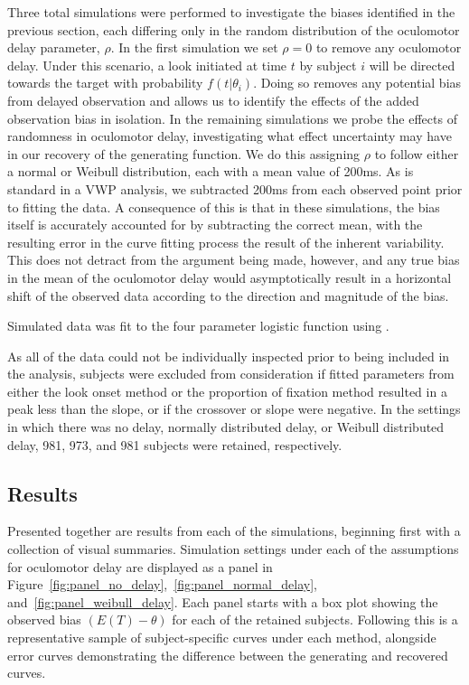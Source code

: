 Three total simulations were performed to investigate the biases identified in the previous section, each differing only in the random distribution of the oculomotor delay parameter, $\rho$. In the first simulation we set $\rho = 0$ to remove any oculomotor delay. Under this scenario, a look initiated at time $t$ by subject $i$ will be directed towards the target with probability $f(t|\theta_i)$. Doing so removes any potential bias from delayed observation and allows us to identify the effects of the added observation bias in isolation. In the remaining simulations we probe the effects of randomness in oculomotor delay, investigating what effect uncertainty may have in our recovery of the generating function. We do this assigning $\rho$ to follow either a normal or Weibull distribution, each with a mean value of 200ms. As is standard in a VWP analysis, we subtracted 200ms from each observed point prior to fitting the data. A consequence of this is that in these simulations, the bias itself is accurately accounted for by subtracting the correct mean, with the resulting error in the curve fitting process the result of the inherent variability. This does not detract from the argument being made, however, and any true bias in the mean of the oculomotor delay would asymptotically result in a horizontal shift of the observed data according to the direction and magnitude of the bias.

Simulated data was fit to the four parameter logistic function using .

As all of the data could not be individually inspected prior to being included in the analysis, subjects were excluded from consideration if fitted parameters from either the look onset method or the proportion of fixation method resulted in a peak less than the slope, or if the crossover or slope were negative. In the settings in which there was no delay, normally distributed delay, or Weibull distributed delay, 981, 973, and 981 subjects were retained, respectively.


\subsection{Results}

Presented together are results from each of the simulations, beginning first with a collection of visual summaries. Simulation settings under each of the assumptions for oculomotor delay are displayed as a panel in Figure~\ref{fig:panel_no_delay},~\ref{fig:panel_normal_delay}, and~\ref{fig:panel_weibull_delay}. Each panel starts with a box plot showing the observed bias $(E(T) - \theta)$ for each of the retained subjects. Following this is a representative sample of subject-specific curves under each method, alongside error curves demonstrating the difference between the generating and recovered curves. 

